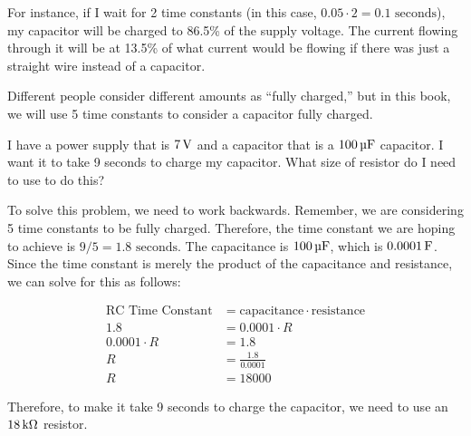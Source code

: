 For instance, if I wait for 2 time constants (in this case, $0.05 \cdot 2 = 0.1\textrm{ seconds}$), my capacitor will be charged to 86.5\% of the supply voltage.
The current flowing through it will be at 13.5\% of what current would be flowing if there was just a straight wire instead of a capacitor.

Different people consider different amounts as ``fully charged,'' but in this book, we will use 5 time constants to consider a capacitor fully charged.

\begin{exampleprob}
I have a power supply that is $7\,\si{\volt}$ and a capacitor that is a $100\,\si{\micro\farad}$ capacitor.
I want it to take 9 seconds to charge my capacitor.
What size of resistor do I need to use to do this?

To solve this problem, we need to work backwards.
Remember, we are considering 5 time constants to be fully charged.
Therefore, the time constant we are hoping to achieve is $9 / 5 = 1.8\textrm{ seconds}$.
The capacitance is $100\,\si{\micro\farad}$, which is $0.0001\,\si{\farad}$.
Since the time constant is merely the product of the capacitance and resistance, we can solve for this as follows:

\begin{align*}
\textrm{RC Time Constant} &= \textrm{capacitance} \cdot \textrm{resistance} \\
1.8 &= 0.0001 \cdot R \\
0.0001 \cdot R &= 1.8 \\
R &= \frac{1.8}{0.0001} \\
R &= 18000
\end{align*}

Therefore, to make it take 9 seconds to charge the capacitor, we need to use an $18\,\si{\kilo\ohm}$ resistor.
\end{exampleprob}
